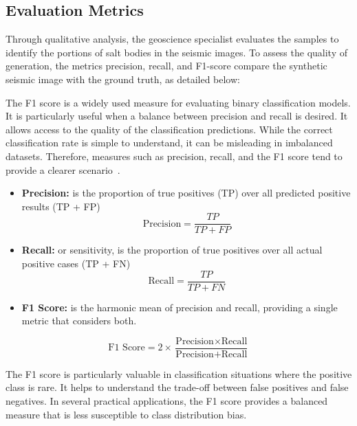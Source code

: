 \documentclass{ieeeaccess}
\begin{document}
\subsection{Evaluation Metrics}

Through qualitative analysis, the geoscience specialist evaluates the samples to identify the portions of salt bodies in the seismic images. To assess the quality of generation, the metrics precision, recall, and F1-score compare the synthetic seismic image with the ground truth, as detailed below:

The F1 score is a widely used measure for evaluating binary classification models. It is particularly useful when a balance between precision and recall is desired. It allows access to the quality of the classification predictions. While the correct classification rate is simple to understand, it can be misleading in imbalanced datasets. Therefore, measures such as precision, recall, and the F1 score tend to provide a clearer scenario~\cite{Powers2011}.

\begin{itemize}
    \item \textbf{Precision:} is the proportion of true positives (TP) over all predicted positive results (TP + FP)
    \begin{equation}
    \text{Precision} = \frac{TP}{TP + FP}
    \end{equation}

    \item \textbf{Recall:} or sensitivity, is the proportion of true positives over all actual positive cases (TP + FN)
    \begin{equation}
    \text{Recall} = \frac{TP}{TP + FN}
    \end{equation}


    \item \textbf{F1 Score:} is the harmonic mean of precision and recall, providing a single metric that considers both. 

\end{itemize}
    \begin{equation}
    \text{F1 Score} = 2 \times \frac{\text{Precision} \times \text{Recall}}{\text{Precision} + \text{Recall}}
    \end{equation}
    
 The F1 score is particularly valuable in classification situations where the positive class is rare. It helps to understand the trade-off between false positives and false negatives. In several practical applications, the F1 score provides a balanced measure that is less susceptible to class distribution bias.
\end{document}

